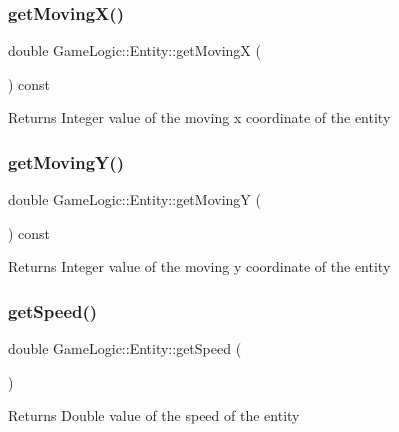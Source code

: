 \subsubsection{\texorpdfstring{get\+Moving\+X()}{getMovingX()}}
{\footnotesize\ttfamily double Game\+Logic\+::\+Entity\+::get\+MovingX (\begin{DoxyParamCaption}{ }\end{DoxyParamCaption}) const}

\begin{DoxyReturn}{Returns}
Integer value of the moving x coordinate of the entity 
\end{DoxyReturn}
\mbox{\label{classGameLogic_1_1Entity_a5e10708660f91ce9a225c08ebbecf7fd}} 
\subsubsection{\texorpdfstring{get\+Moving\+Y()}{getMovingY()}}
{\footnotesize\ttfamily double Game\+Logic\+::\+Entity\+::get\+MovingY (\begin{DoxyParamCaption}{ }\end{DoxyParamCaption}) const}

\begin{DoxyReturn}{Returns}
Integer value of the moving y coordinate of the entity 
\end{DoxyReturn}
\mbox{\label{classGameLogic_1_1Entity_a7c0d8853692bccc978847b658d45fb5e}} 
\subsubsection{\texorpdfstring{get\+Speed()}{getSpeed()}}
{\footnotesize\ttfamily double Game\+Logic\+::\+Entity\+::get\+Speed (\begin{DoxyParamCaption}{ }\end{DoxyParamCaption})}

\begin{DoxyReturn}{Returns}
Double value of the speed of the entity 
\end{DoxyReturn}
\mbox{\label{classGameLogic_1_1Entity_a8bdd4210279142027ba149483b89ff01}} 
